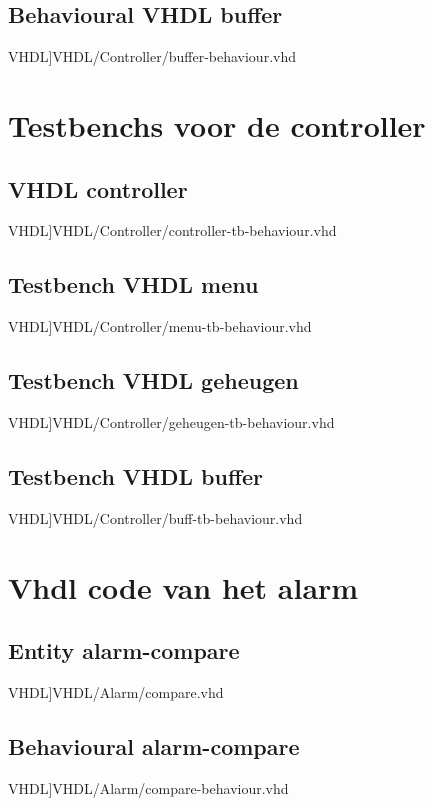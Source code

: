 \subsection{Behavioural VHDL buffer}
\scriptsize 
 VHDL]{VHDL/Controller/buffer-behaviour.vhd}
\normalsize
\label{code:buffer_beh}
\section{Testbenchs voor de controller}
\subsection{VHDL controller}
\scriptsize 
 VHDL]{VHDL/Controller/controller-tb-behaviour.vhd}
\normalsize
\label{code:tb_controller}
\subsection{Testbench VHDL menu}
\scriptsize 
 VHDL]{VHDL/Controller/menu-tb-behaviour.vhd}
\normalsize
\label{code:tb_menu}
\subsection{Testbench VHDL geheugen}
\scriptsize 
 VHDL]{VHDL/Controller/geheugen-tb-behaviour.vhd}
\normalsize
\label{code:tb_geheugen}
\subsection{Testbench VHDL buffer}
\scriptsize 
 VHDL]{VHDL/Controller/buff-tb-behaviour.vhd}
\normalsize
\label{code:tb_buffer}

\section{Vhdl code van het alarm}
\label{Ap:code_alarm}
\subsection{Entity alarm-compare}
\scriptsize 
 VHDL]{VHDL/Alarm/compare.vhd}
\normalsize
\label{code:ent_alarm_compare}
\subsection{Behavioural alarm-compare}
\scriptsize 
 VHDL]{VHDL/Alarm/compare-behaviour.vhd}
\normalsize
\label{code:beh_alarm_compare}
